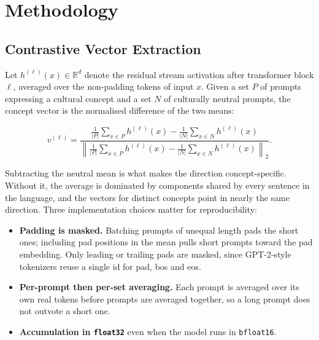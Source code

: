 \documentclass[11pt,a4paper]{article}
\begin{document}
\section{Methodology}
\label{sec:methodology}

\subsection{Contrastive Vector Extraction}
\label{sec:extraction}

Let $h^{(\ell)}(x) \in \mathbb{R}^{d}$ denote the residual stream activation
after transformer block $\ell$, averaged over the non-padding tokens of input
$x$. Given a set $P$ of prompts expressing a cultural concept and a set $N$ of
culturally neutral prompts, the concept vector is the normalised difference of
the two means:

\begin{equation}
  \label{eq:extraction}
  v^{(\ell)} =
  \frac{
    \frac{1}{|P|}\sum_{x \in P} h^{(\ell)}(x)
    - \frac{1}{|N|}\sum_{x \in N} h^{(\ell)}(x)
  }{
    \left\lVert
      \frac{1}{|P|}\sum_{x \in P} h^{(\ell)}(x)
      - \frac{1}{|N|}\sum_{x \in N} h^{(\ell)}(x)
    \right\rVert_{2}
  }.
\end{equation}

Subtracting the neutral mean is what makes the direction concept-specific.
Without it, the average is dominated by components shared by every sentence in
the language, and the vectors for distinct concepts point in nearly the same
direction. Three implementation choices matter for reproducibility:

\begin{itemize}
  \item \textbf{Padding is masked.} Batching prompts of unequal length pads the
        short ones; including pad positions in the mean pulls short prompts
        toward the pad embedding. Only leading or trailing pads are masked,
        since GPT-2-style tokenizers reuse a single id for pad, bos and eos.
  \item \textbf{Per-prompt then per-set averaging.} Each prompt is averaged
        over its own real tokens before prompts are averaged together, so a
        long prompt does not outvote a short one.
  \item \textbf{Accumulation in \texttt{float32}} even when the model runs in
        \texttt{bfloat16}.
\end{itemize}
\end{document}
